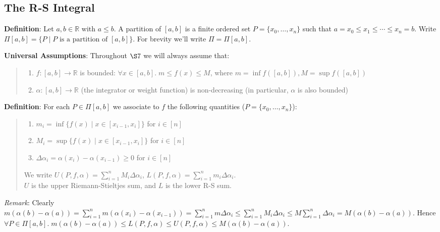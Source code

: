 \documentclass[11pt]{article}
\begin{document}
\subsection{The R-S Integral}

\textbf{Definition}: Let $a,b \in \mathbb{R}$ with $a \leq b$. A partition of $[a,b]$ is a finite ordered set $P = \{x_0, \ldots, x_n\}$ such that $a = x_0 \leq x_1 \leq \cdots \leq x_n = b$. Write $\Pi[a,b] = \{P \;|\; P \text{ is a partition of }[a,b]\}$. For brevity we'll write $\Pi = \Pi[a,b]$.

\textbf{Universal Assumptions}: Throughout $\S 7$ we will always assume that:
\begin{quote}\vspace{-0.3cm}
	\begin{enumerate}
	\item $f : [a,b] \to \mathbb{R}$ is bounded: $\forall x \in [a,b].\; m \leq f(x) \leq M$, where $m = \inf f([a,b]), M = \sup f([a,b])$
	\item $\alpha : [a, b] \to \mathbb{R}$ (the integrator or weight function) is non-decreasing (in particular, $\alpha$ is also bounded)
	\end{enumerate}
\end{quote}

\textbf{Definition}: For each $P \in \Pi[a,b]$ we associate to $f$ the following quantities ($P = \{x_0, \ldots, x_n\}$):
\begin{quote}\vspace{-0.3cm}
	\begin{enumerate}
	\item $m_i = \inf \{f(x) \;|\; x \in [x_{i-1}, x_i]\}$ for $i \in [n]$
	\item $M_i = \sup \{f(x) \;|\; x \in [x_{i-1}, x_i]\}$ for $i \in [n]$
	\item $\Delta \alpha_i = \alpha(x_i) - \alpha(x_{i-1}) \geq 0$ for $i \in [n]$
	\end{enumerate}

	We write $U(P, f, \alpha) = \sum_{i=1}^n M_i \Delta \alpha_i$, $L(P, f, \alpha) = \sum_{i=1}^n m_i \Delta \alpha_i$.\\
$U$ is the upper Riemann-Stieltjes sum, and $L$ is the lower R-S sum.
\end{quote}

\emph{Remark}: Clearly $m(\alpha(b) - \alpha(a)) = \sum_{i=1}^n m(\alpha(x_i) - \alpha(x_{i-1})) = \sum_{i=1}^n m \Delta \alpha_i \leq \sum_{i=1}^n M_i \Delta \alpha_i \leq M \sum_{i=1}^n \Delta \alpha_i = M(\alpha(b) - \alpha(a))$. Hence $\forall P \in \Pi[a,b].\; m(\alpha(b) - \alpha(a)) \leq L(P, f, \alpha) \leq U(P, f, \alpha) \leq M(\alpha(b) - \alpha(a))$.\\
\end{document}
